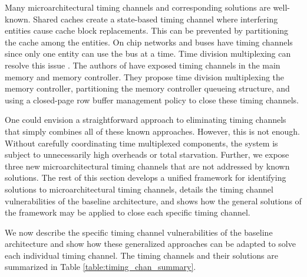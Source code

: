 Many microarchitectural timing channels and corresponding solutions are 
well-known. Shared caches create a state-based timing channel where interfering 
entities cause cache block replacements. This can be prevented by partitioning 
the cache among the entities. On chip networks and buses have
timing channels since only one entity can use the bus at a time. Time division 
multiplexing can resolve this issue \cite{yaonocs}. The authors of 
\cite{ushpca14} have exposed timing channels in the main memory and memory 
controller. They propose time division multiplexing the memory controller, 
partitioning the memory controller queueing structure, and using a closed-page 
row buffer management policy to close these timing channels. 

One could envision a straightforward approach to eliminating timing channels 
that simply combines all of these known approaches. However, this is not 
enough. Without carefully coordinating time multiplexed components, the system 
is subject to unnecessarily high overheads or total starvation.  Further, we 
expose three new microarchitectural timing channels that are not addressed by 
known solutions. The rest of this section develops a unified framework for 
identifying solutions to microarchitectural timing channels,
details the timing channel vulnerabilities of the baseline architecture, and 
shows how the general solutions of the framework may be applied to close each 
specific timing channel.

We now describe the specific timing channel vulnerabilities of the baseline 
architecture and show how these generalized approaches can be adapted to solve 
each individual timing channel. The timing channels and their solutions are 
summarized in Table \ref{table:timing_chan_summary}.

